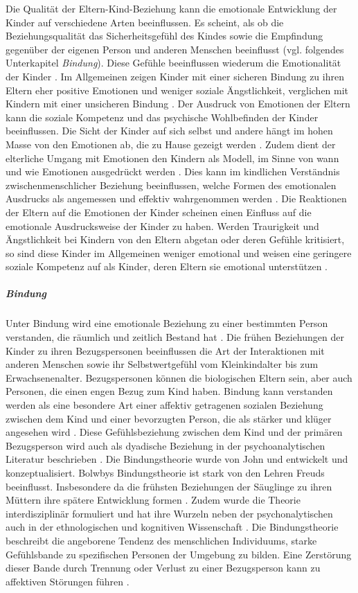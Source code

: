Die Qualität der Eltern-Kind-Beziehung kann die emotionale Entwicklung der Kinder auf verschiedene Arten beeinflussen. Es scheint, als ob die Beziehungsqualität das Sicherheitsgefühl des Kindes sowie die Empfindung gegenüber der eigenen Person und anderen Menschen beeinflusst (vgl. folgendes Unterkapitel \textit{Bindung}). Diese Gefühle beeinflussen wiederum die Emotionalität der Kinder \cite[S.~561]{Siegler2008}. Im Allgemeinen zeigen Kinder mit einer sicheren Bindung zu ihren Eltern eher positive Emotionen und weniger soziale Ängstlichkeit, verglichen mit Kindern mit einer unsicheren Bindung \cite{Bohlin2000}. Der Ausdruck von Emotionen der Eltern kann die soziale Kompetenz und das psychische Wohlbefinden der Kinder beeinflussen. Die Sicht der Kinder auf sich selbst und andere hängt im hohen Masse von den Emotionen ab, die zu Hause gezeigt werden \cite{Dunsmore1997}. Zudem dient der elterliche Umgang mit Emotionen den Kindern als Modell, im Sinne von wann und wie Emotionen ausgedrückt werden \cite{Denham1994}. Dies kann im kindlichen Verständnis zwischenmenschlicher Beziehung beeinflussen, welche Formen des emotionalen Ausdrucks als angemessen und effektiv wahrgenommen werden \cite{Halberstadt1995}. Die Reaktionen der Eltern auf die Emotionen der Kinder scheinen einen Einfluss auf die emotionale Ausdrucksweise der Kinder zu haben. Werden Traurigkeit und Ängstlichkeit bei Kindern von den Eltern abgetan oder deren Gefühle kritisiert, so sind diese Kinder im Allgemeinen weniger emotional und weisen eine geringere soziale Kompetenz auf als Kinder, deren Eltern sie emotional unterstützen \cite{Eisenberg1998, McDowell2000}. 

\subparagraph{Bindung}\label{par:Bindung}
Unter Bindung wird eine emotionale Beziehung zu einer bestimmten Person verstanden, die räumlich und zeitlich Bestand hat \cite[S.~585 ff.]{Siegler2008}. Die frühen Beziehungen der Kinder zu ihren Bezugspersonen beeinflussen die Art der Interaktionen mit anderen Menschen sowie ihr Selbstwertgefühl vom Kleinkindalter bis zum Erwachsenenalter. Bezugspersonen können die biologischen Eltern sein, aber auch Personen, die einen engen Bezug zum Kind haben. Bindung kann verstanden werden als eine besondere Art einer affektiv getragenen sozialen Beziehung zwischen dem Kind und einer bevorzugten Person, die als stärker und klüger angesehen wird \cite{Biringen1994}. Diese Gefühlsbeziehung zwischen dem Kind und der primären Bezugsperson wird auch als dyadische Beziehung in der psychoanalytischen Literatur beschrieben \cite{Resch1999}. Die Bindungstheorie wurde von John  und  entwickelt und konzeptualisiert. Bolwbys Bindungstheorie ist stark von den Lehren Freuds beeinflusst. Insbesondere da die frühsten Beziehungen der Säuglinge zu ihren Müttern ihre spätere Entwicklung formen \cite{Siegler2008}. Zudem wurde die Theorie interdisziplinär formuliert und hat ihre Wurzeln neben der psychonalytischen auch in der ethnologischen und kognitiven Wissenschaft \cite{Resch1999}. Die Bindungstheorie beschreibt die angeborene Tendenz des menschlichen Individuums, starke Gefühlsbande zu spezifischen Personen der Umgebung zu bilden. Eine Zerstörung dieser Bande durch Trennung oder Verlust zu einer Bezugsperson kann zu affektiven Störungen führen \cite{Resch1999}. 


